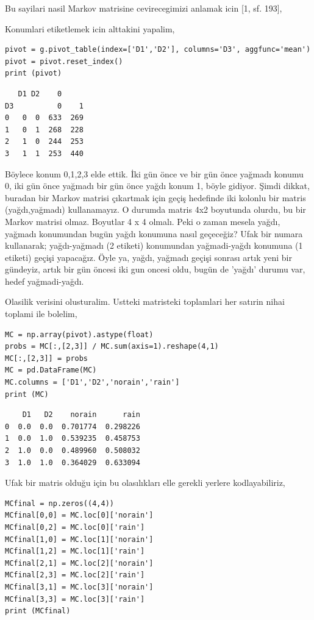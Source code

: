 \documentclass[12pt,fleqn]{article}\usepackage{../../common}
\begin{document}
Bu sayilari nasil Markov matrisine cevirecegimizi anlamak icin [1, sf. 193],

Konumlari etiketlemek icin alttakini yapalim,

\begin{verbatim}
pivot = g.pivot_table(index=['D1','D2'], columns='D3', aggfunc='mean')
pivot = pivot.reset_index()
print (pivot)
\end{verbatim}

\begin{verbatim}
   D1 D2    0     
D3          0    1
0   0  0  633  269
1   0  1  268  228
2   1  0  244  253
3   1  1  253  440
\end{verbatim}

Böylece konum 0,1,2,3 elde ettik. İki gün önce ve bir gün önce yağmadı konumu 0,
iki gün önce yağmadı bir gün önce yağdı konum 1, böyle gidiyor. Şimdi dikkat,
buradan bir Markov matrisi çıkartmak için geçiş hedefinde iki kolonlu bir matris
(yağdı,yağmadı) kullanamayız. O durumda matris 4x2 boyutunda olurdu, bu bir
Markov matrisi olmaz. Boyutlar 4 x 4 olmalı. Peki o zaman mesela yağdı, yağmadı
konumundan bugün yağdı konumuna nasıl geçeceğiz? Ufak bir numara kullanarak;
yağdı-yağmadı (2 etiketi) konumundan yağmadi-yağdı konumuna (1 etiketi) geçişi
yapacağız. Öyle ya, yağdı, yağmadı geçişi sonrası artık yeni bir gündeyiz, artık
bir gün öncesi iki gun oncesi oldu, bugün de 'yağdı' durumu var, hedef yağmadi-yağdı.

Olasilik verisini olusturalim. Ustteki matristeki toplamlari her satırin nihai
toplami ile bolelim,

\begin{verbatim}
MC = np.array(pivot).astype(float)
probs = MC[:,[2,3]] / MC.sum(axis=1).reshape(4,1)
MC[:,[2,3]] = probs
MC = pd.DataFrame(MC)
MC.columns = ['D1','D2','norain','rain']
print (MC)
\end{verbatim}

\begin{verbatim}
    D1   D2    norain      rain
0  0.0  0.0  0.701774  0.298226
1  0.0  1.0  0.539235  0.458753
2  1.0  0.0  0.489960  0.508032
3  1.0  1.0  0.364029  0.633094
\end{verbatim}

Ufak bir matris olduğu için bu olasılıkları elle gerekli yerlere kodlayabiliriz,

\begin{verbatim}
MCfinal = np.zeros((4,4))
MCfinal[0,0] = MC.loc[0]['norain']
MCfinal[0,2] = MC.loc[0]['rain']
MCfinal[1,0] = MC.loc[1]['norain']
MCfinal[1,2] = MC.loc[1]['rain']
MCfinal[2,1] = MC.loc[2]['norain']
MCfinal[2,3] = MC.loc[2]['rain']
MCfinal[3,1] = MC.loc[3]['norain']
MCfinal[3,3] = MC.loc[3]['rain']
print (MCfinal)
\end{verbatim}
\end{document}
